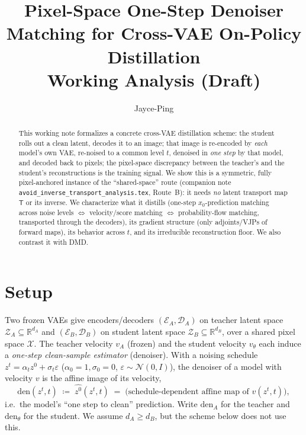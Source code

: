 \documentclass[11pt,a4paper]{article}
\title{\textbf{Pixel-Space One-Step Denoiser Matching for Cross-VAE On-Policy Distillation}\\[0.3em]
\large Working Analysis (Draft)}
\author{Jayce-Ping}
\date{}
\newcommand{\R}{\mathbb{R}}
\newcommand{\N}{\mathcal{N}}
\newcommand{\Xspace}{\mathcal{X}}
\newcommand{\Za}{\mathcal{Z}_{A}}
\newcommand{\Zb}{\mathcal{Z}_{B}}
\newcommand{\Enc}{\mathcal{E}}
\newcommand{\Dec}{\mathcal{D}}
\newcommand{\den}{\mathrm{den}}
\theoremstyle{definition}
\begin{document}
\maketitle

\begin{abstract}
This working note formalizes a concrete cross-VAE distillation scheme: the student rolls out a
clean latent, decodes it to an image; that image is re-encoded by \emph{each} model's own VAE,
re-noised to a common level $t$, denoised in \emph{one step} by that model, and decoded back to
pixels; the pixel-space discrepancy between the teacher's and the student's reconstructions is the
training signal. We show this is a symmetric, fully pixel-anchored instance of the ``shared-space''
route (companion note \texttt{avoid\_inverse\_transport\_analysis.tex}, Route~B): it needs
\emph{no} latent transport map $\mathsf{T}$ or its inverse. We characterize what it distills
(one-step $x_0$-prediction matching across noise levels $\Leftrightarrow$ velocity/score matching
$\Leftrightarrow$ probability-flow matching, transported through the decoders), its gradient
structure (only adjoints/VJPs of forward maps), its behavior across $t$, and its irreducible
reconstruction floor. We also contrast it with DMD.
\end{abstract}

\section{Setup}
\label{sec:setup}

Two frozen VAEs give encoders/decoders $(\Enc_A,\Dec_A)$ on teacher latent space
$\Za\subseteq\R^{d_A}$ and $(\Enc_B,\Dec_B)$ on student latent space $\Zb\subseteq\R^{d_B}$, over a
shared pixel space $\Xspace$. The teacher velocity $v_A$ (frozen) and the student velocity
$v_\theta$ each induce a \emph{one-step clean-sample estimator} (denoiser). With a noising schedule
$z^t=\alpha_t z^0+\sigma_t\varepsilon$ ($\alpha_0=1,\sigma_0=0$, $\varepsilon\sim\N(0,I)$), the
denoiser of a model with velocity $v$ is the affine image of its velocity,
\begin{equation}
\den(z^t,t)\;\coloneqq\;\widehat{z^0}(z^t,t)
\;=\;\text{(schedule-dependent affine map of } v(z^t,t)\text{)},
\label{eq:den-def}
\end{equation}
i.e.\ the model's ``one step to clean'' prediction. Write $\den_A$ for the teacher and
$\den_\theta$ for the student. We assume $d_A\ge d_B$, but the scheme below does not use this.
\end{document}
